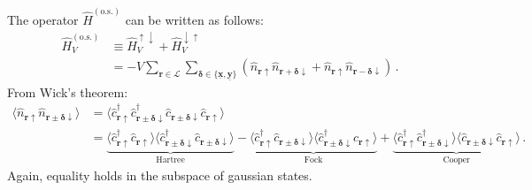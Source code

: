The operator $\hat H^{(\mathrm{o.s.})}$ can be written as follows:
\begin{align}
	\hat H_V^{(\text{o.s.})} &\equiv \hat H_V^{\uparrow\downarrow}  + \hat H_V^{\downarrow\uparrow} \nonumber \\
	&= - V 
	\sum_{\mathbf{r}\in\mathcal{L}} \sum_{\bm{\delta}\in \lbrace \underline{\mathbf{x}}, \underline{\mathbf{y}} \rbrace} \left(\hat n_{\mathbf{r}\uparrow} \hat n_{\mathbf{r}+\bm{\delta}\downarrow} + \hat n_{\mathbf{r}\uparrow} \hat n_{\mathbf{r}-\bm{\delta}\downarrow}\right) \label{eq:ehm-HV(os)} \, .
\end{align}
From Wick's theorem:
\begin{align}
	\langle 
	\hat n_{\mathbf{r}\uparrow} \hat n_{\mathbf{r} \pm \bm{\delta} \downarrow}
	\rangle &= \langle
	\hat c_{\mathbf{r}\uparrow}^\dagger \hat c_{\mathbf{r} \pm \bm{\delta} \downarrow}^\dagger \hat c_{\mathbf{r} \pm \bm{\delta} \downarrow} \hat c_{\mathbf{r}\uparrow}
	\rangle \nonumber \\
	&=
	\underbrace{
		\langle 
		\hat c_{\mathbf{r}\uparrow}^\dagger \hat c_{\mathbf{r}\uparrow}
		\rangle \langle	
		\hat c_{\mathbf{r} \pm \bm{\delta} \downarrow}^\dagger \hat c_{\mathbf{r} \pm \bm{\delta} \downarrow}
		\rangle
	}_{\text{Hartree}}
	- 
	\underbrace{
		\langle 
		\hat c_{\mathbf{r}\uparrow}^\dagger \hat c_{\mathbf{r} \pm \bm{\delta} \downarrow}
		\rangle \langle	
		\hat c_{\mathbf{r} \pm \bm{\delta} \downarrow}^\dagger \hat c_{\mathbf{r}\uparrow}
		\rangle 
	}_{\text{Fock}}
	+
	\underbrace{
		\langle 
		\hat c_{\mathbf{r}\uparrow}^\dagger \hat c_{\mathbf{r} \pm \bm{\delta} \downarrow}^\dagger
		\rangle \langle	
		\hat c_{\mathbf{r} \pm \bm{\delta} \downarrow} \hat c_{\mathbf{r}\uparrow}
		\rangle 
	}_{\text{Cooper}}	
	\label{eq:ehm-HV(os)-wick} \, .
\end{align}
Again, equality holds in the subspace of gaussian states.

